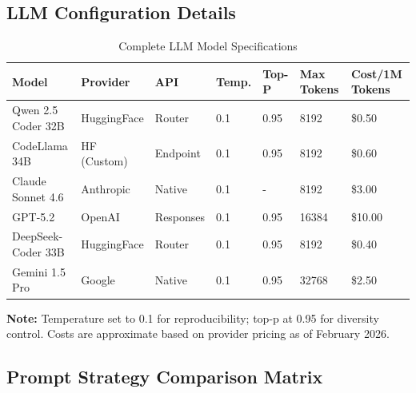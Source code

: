 \subsection{LLM Configuration Details}

\begin{table}[h]
\centering
\caption{Complete LLM Model Specifications}
\label{tab:llm-specs-detailed}
\scriptsize
\begin{tabular}{@{}lllllll@{}}
\toprule
\textbf{Model} & \textbf{Provider} & \textbf{API} & \textbf{Temp.} & \textbf{Top-P} & \textbf{Max Tokens} & \textbf{Cost/1M Tokens} \\ \midrule
Qwen 2.5 Coder 32B & HuggingFace & Router & 0.1 & 0.95 & 8192 & \$0.50 \\
CodeLlama 34B & HF (Custom) & Endpoint & 0.1 & 0.95 & 8192 & \$0.60 \\
Claude Sonnet 4.6 & Anthropic & Native & 0.1 & - & 8192 & \$3.00 \\
GPT-5.2 & OpenAI & Responses & 0.1 & 0.95 & 16384 & \$10.00 \\
DeepSeek-Coder 33B & HuggingFace & Router & 0.1 & 0.95 & 8192 & \$0.40 \\
Gemini 1.5 Pro & Google & Native & 0.1 & 0.95 & 32768 & \$2.50 \\ \bottomrule
\end{tabular}
\end{table}

\textbf{Note:} Temperature set to 0.1 for reproducibility; top-p at 0.95 for diversity control. Costs are approximate based on provider pricing as of February 2026.

\subsection{Prompt Strategy Comparison Matrix}

